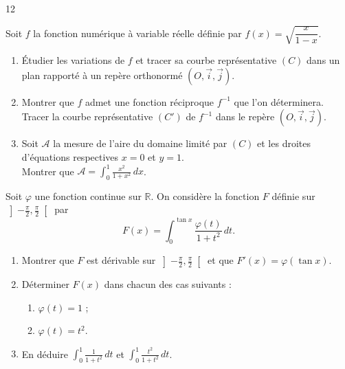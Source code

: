 \documentclass{axiobac}
\begin{document}
\begin{probleme}{12}


Soit $f$ la fonction numérique à variable réelle définie par $f(x) = \sqrt{\dfrac{x}{1 - x}}$.

\begin{enumerate}
    \item Étudier les variations de $f$ et tracer sa courbe représentative $(C)$ dans un plan rapporté à un repère orthonormé $(O, \vec{i}, \vec{j})$.
    \item Montrer que $f$ admet une fonction réciproque $f^{-1}$ que l'on déterminera. Tracer la courbe représentative $(C')$ de $f^{-1}$ dans le repère $(O, \vec{i}, \vec{j})$.
    \item Soit $\mathcal{A}$ la mesure de l'aire du domaine limité par $(C)$ et les droites d'équations respectives $x = 0$ et $y = 1$. \\
    Montrer que $\mathcal{A} = \displaystyle\int_0^1 \frac{x^2}{1 + x^2} \, dx$.
\end{enumerate}


Soit $\varphi$ une fonction continue sur $\mathbb{R}$. On considère la fonction $F$ définie sur $\left]-\frac{\pi}{2}, \frac{\pi}{2}\right[$ par
\[
F(x) = \int_0^{\tan x} \frac{\varphi(t)}{1 + t^2} \, dt .
\]

\begin{enumerate}
    \item Montrer que $F$ est dérivable sur $\left]-\frac{\pi}{2}, \frac{\pi}{2}\right[$ et que $F'(x) = \varphi(\tan x)$.
    \item Déterminer $F(x)$ dans chacun des cas suivants :
    \begin{enumerate}
        \item $\varphi(t) = 1$ ;
        \item $\varphi(t) = t^2$.
    \end{enumerate}
    \item En déduire $\displaystyle\int_0^1 \frac{1}{1 + t^2} \, dt$ et $\displaystyle\int_0^1 \frac{t^2}{1 + t^2} \, dt$.
\end{enumerate}


\end{probleme}
\end{document}
